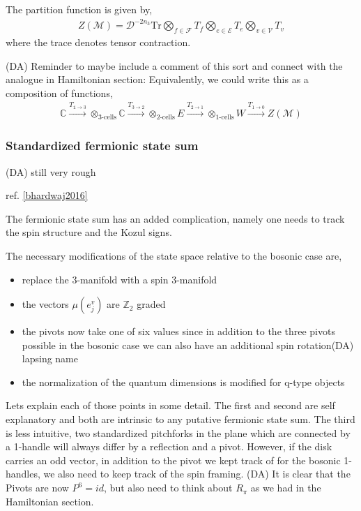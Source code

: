 \documentclass[12pt,a4paper]{article}
\newcounter{arrow}
\newcommand{\tp}{\otimes}
\newcommand{\ra}{\rightarrow}
\newcommand{\unit}{\mathds{1}}
\newcommand{\mce}{\mathcal{E}}
\newcommand{\cc}{\mathbb{C}}
\newcommand{\mcd}{\mathcal{D}}
\newcommand{\mcm}{\mathcal{M}}
\newcommand{\mcv}{\mathcal{V}}
\newcommand{\zt}{\mathbb{Z}_2}
\newcommand{\mcf}{\mathcal{F}}
\newcommand{\Tr}{\text{Tr}}
\newcommand{\dave}[1]{{\color{ao(english)}\footnotesize{(DA) #1}}}
\begin{document}
The partition function is given by,
\begin{align}
Z(\mcm) = \mcd^{-2n_3} \Tr \bigotimes_{f \in \mcf}  T_f \bigotimes_{e \in \mce} T_e \bigotimes_{v \in \mcv} T_v
\label{Bosonic_partition_function}
\end{align}
where the trace denotes tensor contraction. 

\dave{Reminder to maybe include a comment of this sort and connect with the analogue in Hamiltonian section:
Equivalently, we could write this as a composition of functions, 
\begin{align}
\cc \xrightarrow{T_{\unit \ra3}} \tp_{\text{3-cells}}\cc  \xrightarrow{T_{3\ra2}} \tp_{\text{2-cells}} E \xrightarrow{T_{2\ra1}} \tp_{\text{1-cells}} W \xrightarrow{T_{1 \ra 0} } Z(\mcm)
\end{align}
}



\subsubsection{Standardized fermionic state sum}
\dave{still very rough} 

\label{standardized_fermionic_SS}
ref. \ref{bhardwaj2016}

The fermionic state sum has an added complication, 
namely one needs to track the spin structure and the Kozul signs. 

The necessary modifications of the state space relative to the bosonic case are,
\begin{itemize}
\item replace the 3-manifold with a spin 3-manifold
\item the vectors $\mu(e_j^v)$ are $\zt$ graded
\item the pivots now take one of six values since in addition to the three pivots possible in the bosonic case we can also have an additional spin rotation\dave{lapsing name}
\item the normalization of the quantum dimensions is modified for q-type objects
\end{itemize}
Lets explain each of those points in some detail.
The first and second are self explanatory and both are intrinsic to any putative fermionic state sum. 
The third is less intuitive, 
two standardized pitchforks in the plane which are connected by a 1-handle will always differ by a reflection and a pivot. 
However, if the disk carries an odd vector, 
in addition to the pivot we kept track of for the bosonic 1-handles, 
we also need to keep track of the spin framing.
\dave{
It is clear that the Pivots are now $P^6 = id$, 
but also need to think about $R_\pi$ as we had in the Hamiltonian section.}
\end{document}
